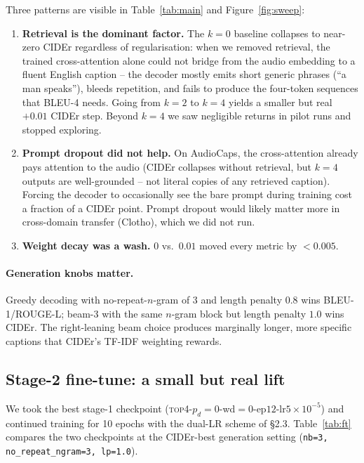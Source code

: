 \documentclass[10pt,twocolumn,letterpaper]{article}
\begin{document}
Three patterns are visible in Table~\ref{tab:main} and
Figure~\ref{fig:sweep}:

\begin{enumerate}\itemsep1pt
\item \textbf{Retrieval is the dominant factor.} The $k{=}0$ baseline collapses
to near-zero CIDEr regardless of regularisation: when we removed retrieval, the
trained cross-attention alone could not bridge from the audio
embedding to a fluent English caption -- the decoder mostly emits short
generic phrases (``a man speaks''), bleeds repetition, and fails to produce
the four-token sequences that BLEU-4 needs. Going from $k{=}2$ to $k{=}4$
yields a smaller but real $+0.01$ CIDEr step. Beyond $k{=}4$ we saw negligible
returns in pilot runs and stopped exploring.
\item \textbf{Prompt dropout did not help.} On AudioCaps, the cross-attention
already pays attention to the audio (CIDEr collapses without retrieval, but
$k{=}4$ outputs are well-grounded -- not literal copies of any retrieved
caption). Forcing the decoder to occasionally see the bare prompt during
training cost a fraction of a CIDEr point. Prompt dropout would likely matter
more in cross-domain transfer (Clotho), which we did not run.
\item \textbf{Weight decay was a wash.} $0$ vs.\ $0.01$ moved every metric by
$<0.005$.
\end{enumerate}

\paragraph{Generation knobs matter.} Greedy decoding with no-repeat-$n$-gram
of 3 and length penalty $0.8$ wins BLEU-1/ROUGE-L; beam-3 with the same
$n$-gram block but length penalty $1.0$ wins CIDEr. The right-leaning
beam choice produces marginally longer, more specific captions that CIDEr's
TF-IDF weighting rewards.

\subsection{Stage-2 fine-tune: a small but real lift}

We took the best stage-1 checkpoint
(\textsc{top4}-$p_d{=}0$-wd$=0$-ep$12$-lr$5{\times}10^{-5}$) and continued
training for 10 epochs with the dual-LR scheme of \S2.3.
Table~\ref{tab:ft} compares the two checkpoints at the CIDEr-best generation
setting (\texttt{nb=3, no\_repeat\_ngram=3, lp=1.0}).
\end{document}
